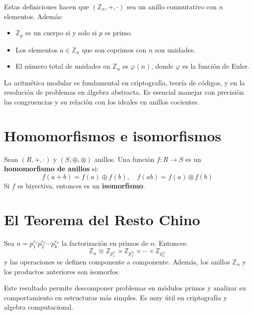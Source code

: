 \documentclass[12pt]{article}
\begin{document}
\bigskip

Estas definiciones hacen que \( (\mathbb{Z}_n, +, \cdot) \) sea un anillo conmutativo con \( n \) elementos. Además:
\begin{itemize}
    \item \( \mathbb{Z}_p \) es un cuerpo si y solo si \( p \) es primo.
    \item Los elementos \( a \in \mathbb{Z}_n \) que son coprimos con \( n \) son unidades.
    \item El número total de unidades en \( \mathbb{Z}_n \) es \( \varphi(n) \), donde \( \varphi \) es la función de Euler.
\end{itemize}

\begin{tcolorbox}[title=Notas y aplicaciones]
La aritmética modular es fundamental en criptografía, teoría de códigos, y en la resolución de problemas en álgebra abstracta. Es esencial manejar con precisión las congruencias y su relación con los ideales en anillos cocientes.
\end{tcolorbox}

\section*{Homomorfismos e isomorfismos}

\begin{tcolorbox}[title=Definición]
Sean \( (R, +, \cdot) \) y \( (S, \oplus, \otimes) \) anillos. Una función \( f: R \to S \) es un \textbf{homomorfismo de anillos} si:
\[
f(a + b) = f(a) \oplus f(b), \quad f(a b) = f(a) \otimes f(b)
\]
Si \( f \) es biyectiva, entonces es un \textbf{isomorfismo}.
\end{tcolorbox}

\section*{El Teorema del Resto Chino}

\begin{tcolorbox}[title=Teorema]
Sea \( n = p_1^{e_1} p_2^{e_2} \cdots p_k^{e_k} \) la factorización en primos de \( n \). Entonces:
\[
\mathbb{Z}_n \cong \mathbb{Z}_{p_1^{e_1}} \times \mathbb{Z}_{p_2^{e_2}} \times \cdots \times \mathbb{Z}_{p_k^{e_k}}
\]
y las operaciones se definen componente a componente. Además, los anillos \( \mathbb{Z}_{n} \) y los productos anteriores son ísomorfos.
\end{tcolorbox}

\begin{tcolorbox}[colback=yellow!15, title=Notas y aplicaciones]
Este resultado permite descomponer problemas en módulos primos y analizar su comportamiento en estructuras más simples. Es muy útil en criptografía y algebra computacional.
\end{tcolorbox}
\end{document}
